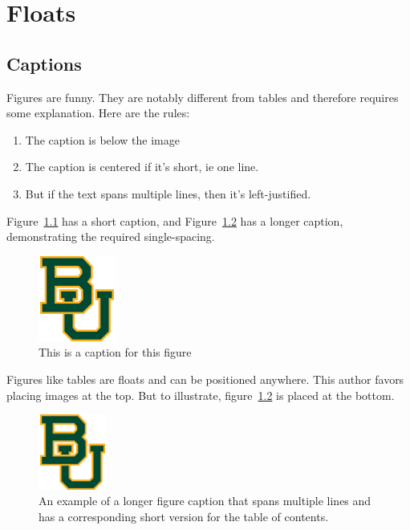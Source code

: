 \chapter{Floats}

\section{Captions}
Figures are funny. They are notably different from tables and therefore requires some explanation. Here are the rules:
\begin{enumerate}
\item The caption is below the image
\item The caption is centered if it's short, ie one line. 
\item But if the text spans multiple lines, then it's left-justified. 
\end{enumerate}

Figure~\ref{figure_example1} has a short caption, and
Figure~\ref{figure_example2} has a longer caption, demonstrating the required
single-spacing.

\begin{figure}[ht]
\centering
\includegraphics[width=1in]{baylor}
\caption{This is a caption for this figure}
\label{figure_example1}
\end{figure}

Figures like tables are floats and can be positioned anywhere. 
This author favors placing images at the top. 
But to illustrate, figure~\ref{figure_example2} is placed at the bottom. 

\begin{figure}[b]
\centering
\includegraphics[width=0.2\textwidth]{baylor}
\caption[The short table of contents version]{An example of a longer figure
caption that spans multiple lines and has a corresponding short version for the
table of contents.}
\label{figure_example2}
\end{figure}

